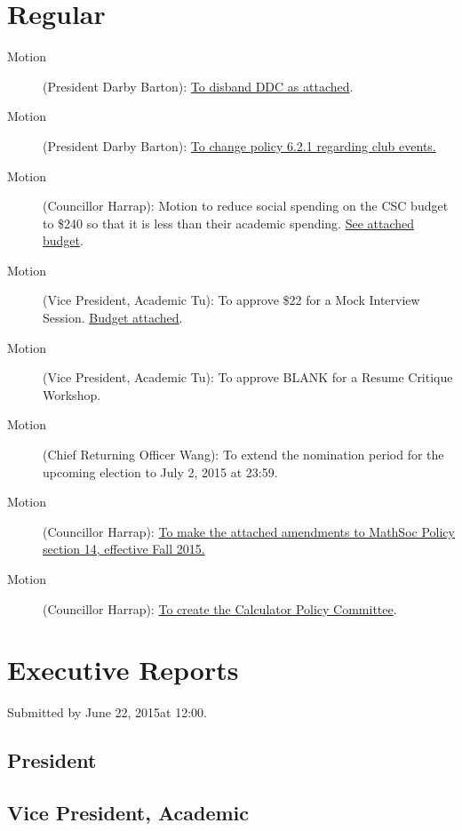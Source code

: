 \documentclass[12pt, letterpaper]{article}
\newcommand{\agendaDate}{June 22, 2015} %
\begin{document}
\section*{Regular}
\begin{description}
	\item[Motion] (President Darby Barton): \hyperref[ddc]{To disband DDC as attached}.
	\item[Motion] (President Darby Barton): \hyperref[clubs]{To change policy 6.2.1 regarding club events.}
	\item[Motion] (Councillor Harrap): Motion to reduce social spending on the CSC budget to \$240 so that it is less than their academic spending. \hyperref[csc]{See attached budget}.
	\item[Motion] (Vice President, Academic Tu): To approve \$22 for a Mock Interview Session. \hyperref[mock]{Budget attached}.
	\item[Motion] (Vice President, Academic Tu): To approve BLANK for a Resume Critique Workshop.
	\item[Motion] (Chief Returning Officer Wang): To extend the nomination period for the upcoming election to July 2, 2015 at 23:59.
	\item[Motion] (Councillor Harrap): \hyperref[cif]{To make the attached amendments to MathSoc Policy section 14, effective Fall 2015.}
	\item[Motion] (Councillor Harrap): \hyperref[calc]{To create the Calculator Policy Committee}.
	
\end{description}

\newpage


\newpage

\section*{Executive Reports}
Submitted by \agendaDate at 12:00.

\subsection*{President}


\subsection*{Vice President, Academic}

\end{document}
